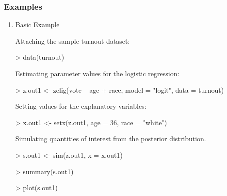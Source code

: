 \documentclass{article}
\begin{document}
\subsubsection{Examples}
\begin{enumerate}
\item {Basic Example}
 
Attaching the sample turnout dataset:
\begin{Schunk}
\begin{Sinput}
> data(turnout)
\end{Sinput}
\end{Schunk}
Estimating parameter values for the logistic regression:
\begin{Schunk}
\begin{Sinput}
> z.out1 <- zelig(vote ~ age + race, model = "logit", data = turnout)
\end{Sinput}
\end{Schunk}
Setting values for the explanatory variables:
\begin{Schunk}
\begin{Sinput}
> x.out1 <- setx(z.out1, age = 36, race = "white")
\end{Sinput}
\end{Schunk}
Simulating quantities of interest from the posterior distribution.
\begin{Schunk}
\begin{Sinput}
> s.out1 <- sim(z.out1, x = x.out1)
\end{Sinput}
\end{Schunk}
\begin{Schunk}
\begin{Sinput}
> summary(s.out1)
\end{Sinput}
\end{Schunk}
\begin{center}
\begin{Schunk}
\begin{Sinput}
> plot(s.out1)
\end{Sinput}
\end{Schunk}

\end{center}
\end{enumerate}
\end{document}
